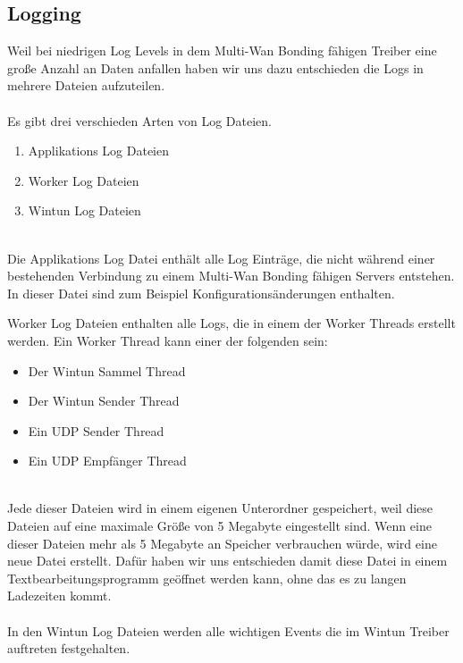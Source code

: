 \subsection{Logging}
Weil bei niedrigen Log Levels in dem Multi-Wan Bonding fähigen Treiber eine große Anzahl an Daten anfallen haben wir uns dazu entschieden die Logs in mehrere Dateien aufzuteilen.
\\\\
Es gibt drei verschieden Arten von Log Dateien.
\\
\begin{enumerate}
    \item Applikations Log Dateien
    \item Worker Log Dateien
    \item Wintun Log Dateien
\end{enumerate}
\ \\
Die Applikations Log Datei enthält alle Log Einträge, die nicht während einer bestehenden Verbindung zu einem Multi-Wan Bonding fähigen Servers entstehen. In dieser Datei sind zum Beispiel Konfigurationsänderungen enthalten.

\newpage

Worker Log Dateien enthalten alle Logs, die in einem der Worker Threads erstellt werden. Ein Worker Thread kann einer der folgenden sein:
\\
\begin{itemize}
    \item Der Wintun Sammel Thread
    \item Der Wintun Sender Thread
    \item Ein UDP Sender Thread
    \item Ein UDP Empfänger Thread
\end{itemize}
\ \\
Jede dieser Dateien wird in einem eigenen Unterordner gespeichert, weil diese Dateien auf eine maximale Größe von 5 Megabyte eingestellt sind. Wenn eine dieser Dateien mehr als 5 Megabyte an Speicher verbrauchen würde, wird eine neue Datei erstellt. Dafür haben wir uns entschieden damit diese Datei in einem Textbearbeitungsprogramm geöffnet werden kann, ohne das es zu langen Ladezeiten kommt.
\\\\
In den Wintun Log Dateien werden alle wichtigen Events die im Wintun Treiber auftreten festgehalten.
